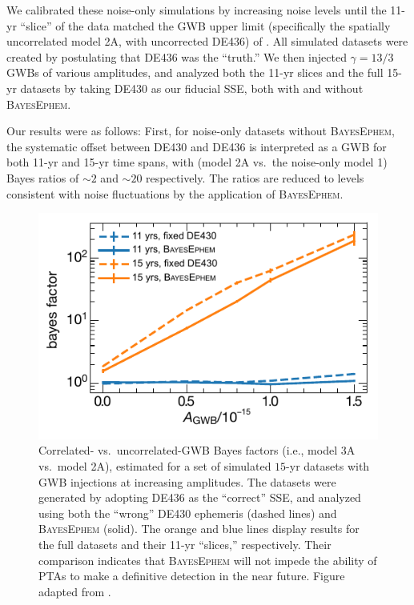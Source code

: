 \documentclass{aastex63}
\begin{document}
We calibrated these noise-only simulations by increasing noise levels until the 11-yr ``slice'' of the data matched the GWB upper limit (specifically the spatially uncorrelated model 2A, with uncorrected DE436) of \cite{2018ApJ...859...47A}.
All simulated datasets were created by postulating that DE436 was the ``truth.'' We then injected $\gamma = 13/3$ GWBs of various amplitudes, and analyzed both the 11-yr slices and the full 15-yr datasets by taking DE430 as our fiducial SSE, both with and without \textsc{BayesEphem}.

Our results were as follows: First, for noise-only datasets without \textsc{BayesEphem}, the systematic offset between DE430 and DE436 is interpreted as a GWB for both 11-yr and 15-yr time spans, with (model 2A vs.\ the noise-only model 1) Bayes ratios of $\sim 2$ and $\sim 20$ respectively. The ratios are reduced to levels consistent with noise fluctuations by the application of \textsc{BayesEphem}.
%
\begin{figure}
    \begin{center}
    \includegraphics{bayesephem_simulations.pdf}
    \caption{Correlated- vs.\ uncorrelated-GWB Bayes factors (i.e., model 3A vs.\ model 2A), estimated for a set of simulated $15$-yr datasets with GWB injections at increasing amplitudes.
    The datasets were generated by adopting DE436 as the ``correct'' SSE, and analyzed using both the ``wrong'' DE430 ephemeris (dashed lines) and \textsc{BayesEphem} (solid). The orange and blue lines display results for the full datasets and their 11-yr ``slices,'' respectively.
    Their comparison indicates that \textsc{BayesEphem} will not impede the ability of PTAs to make a definitive detection in the near future.
    Figure adapted from \cite{2018ApJ...859...47A}.
    \label{fig:simulations}}
    \end{center}
\end{figure}
\end{document}

